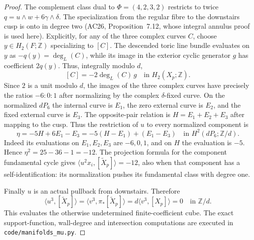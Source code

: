 \begin{proof}
The complement class dual to $\Phi=(4,2,3,2)$ restricts to twice
$q=u\wedge w+6\gamma\wedge\delta$. The specialization from the
regular fibre to the downstairs cusp is onto in degree two
(AC26, Proposition~7.12, whose integral annulus proof is used here).
Explicitly, for any of the three complex curves $C$, choose
$y\in H_2(F;\mathbb Z)$ specializing to $[C]$. The descended
toric line bundle evaluates on $y$ as $-q(y)=\deg_L(C)$,
while its image in the exterior cyclic generator $g$ has
coefficient $2q(y)$. Thus, integrally modulo $d$,
\[
 [C]=-2\deg_L(C)\,g\quad\text{in }H_2(X_p;\mathbb Z).
\]
Since $2$ is a unit modulo $d$, the images of the three
complex curves have precisely the ratios $-6:0:1$ after
normalizing by the complex $\delta$-fixed curve. On the normalized $dP_6$ the
internal curve is $E_1$, the zero external curve is $E_2$, and the
fixed external curve is $E_3$. The opposite-pair relation is
$H=E_1+E_2+E_3$ after mapping to the cusp. Thus the restriction of
$u$ to every normalized component is
\[
 \eta=-5H+6E_1-E_3=-5(H-E_1)+(E_1-E_3)
 \quad\text{in }H^2(dP_6;\mathbb Z/d).
\]
Indeed its evaluations on $E_1,E_2,E_3$ are $-6,0,1$, and on $H$
the evaluation is $-5$. Hence $\eta^2=25-36-1=-12$.
The projection formula for the component fundamental cycle gives
$\langle u^2x_i,[\widetilde X_p]\rangle=-12$, also when that
component has a self-identification: its normalization pushes its
fundamental class with degree one.

Finally $u$ is an actual pullback from downstairs. Therefore
\[
 \langle u^3,[\widetilde X_p]\rangle
 =\langle v^3,\pi_*[\widetilde X_p]\rangle
 =d\langle v^3,[X_p]\rangle=0\quad\text{in }\mathbb Z/d.
\]
This evaluates the otherwise undetermined finite-coefficient cube.
The exact support-function, wall-degree and intersection computations
are executed in \texttt{code/manifolds\_mu.py}.
\end{proof}


